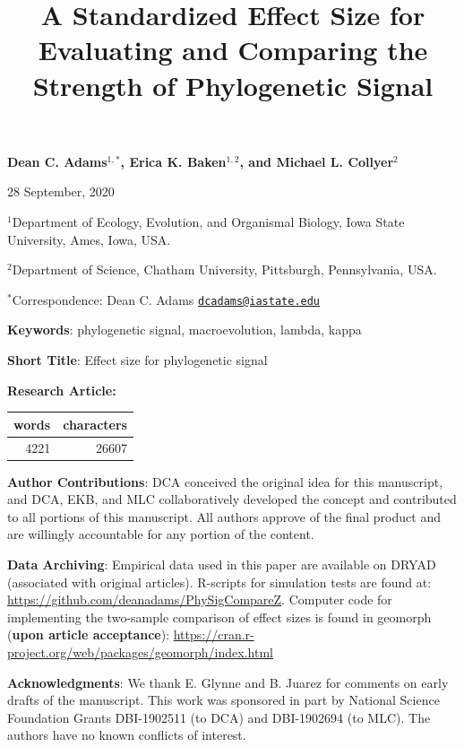 \documentclass[
]{article}
\title{A Standardized Effect Size for Evaluating and Comparing the Strength of
Phylogenetic Signal}
\author{}
\date{\vspace{-2.5em}}
\begin{document}
\maketitle

\begin{center}
\textbf{Dean C. Adams$^{1,*}$, Erica K. Baken$^{1,2}$, and Michael L. Collyer$^2$}
\end{center}

\begin{center}28 September, 2020\end{center}

\(^{1}\)Department of Ecology, Evolution, and Organismal Biology, Iowa
State University, Ames, Iowa, USA.

\(^{2}\)Department of Science, Chatham University, Pittsburgh,
Pennsylvania, USA.

\(^{*}\)Correspondence: Dean C. Adams
\href{mailto:dcadams@iastate.edu}{\nolinkurl{dcadams@iastate.edu}}
\hfill\break

\textbf{Keywords}: phylogenetic signal, macroevolution, lambda, kappa
\hfill\break

\textbf{Short Title}: Effect size for phylogenetic signal \hfill\break

\textbf{Research Article:}

\begin{longtable}[]{@{}rr@{}}
\toprule
words & characters\tabularnewline
\midrule
\endhead
4221 & 26607\tabularnewline
\bottomrule
\end{longtable}

\textbf{Author Contributions}: DCA conceived the original idea for this
manuscript, and DCA, EKB, and MLC collaboratively developed the concept
and contributed to all portions of this manuscript. All authors approve
of the final product and are willingly accountable for any portion of
the content.\hfill\break

\textbf{Data Archiving}: Empirical data used in this paper are available
on DRYAD (associated with original articles). R-scripts for simulation
tests are found at: \url{https://github.com/deanadams/PhySigCompareZ}.
Computer code for implementing the two-sample comparison of effect sizes
is found in geomorph (\textbf{upon article acceptance}):
\url{https://cran.r-project.org/web/packages/geomorph/index.html}
\hfill\break

\textbf{Acknowledgments}: We thank E. Glynne and B. Juarez for comments
on early drafts of the manuscript. This work was sponsored in part by
National Science Foundation Grants DBI-1902511 (to DCA) and DBI-1902694
(to MLC). The authors have no known conflicts of interest.
\end{document}
